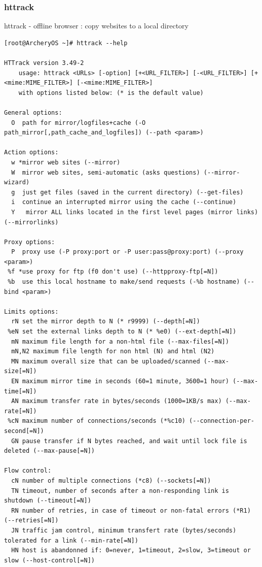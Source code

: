 \documentclass{article}
\begin{document}
\subsubsection{httrack}
httrack - offline browser : copy websites to a local directory
\begin{lstlisting}
[root@ArcheryOS ~]# httrack --help

HTTrack version 3.49-2
	usage: httrack <URLs> [-option] [+<URL_FILTER>] [-<URL_FILTER>] [+<mime:MIME_FILTER>] [-<mime:MIME_FILTER>]
	with options listed below: (* is the default value)

General options:
  O  path for mirror/logfiles+cache (-O path_mirror[,path_cache_and_logfiles]) (--path <param>)

Action options:
  w *mirror web sites (--mirror)
  W  mirror web sites, semi-automatic (asks questions) (--mirror-wizard)
  g  just get files (saved in the current directory) (--get-files)
  i  continue an interrupted mirror using the cache (--continue)
  Y   mirror ALL links located in the first level pages (mirror links) (--mirrorlinks)

Proxy options:
  P  proxy use (-P proxy:port or -P user:pass@proxy:port) (--proxy <param>)
 %f *use proxy for ftp (f0 don't use) (--httpproxy-ftp[=N])
 %b  use this local hostname to make/send requests (-%b hostname) (--bind <param>)

Limits options:
  rN set the mirror depth to N (* r9999) (--depth[=N])
 %eN set the external links depth to N (* %e0) (--ext-depth[=N])
  mN maximum file length for a non-html file (--max-files[=N])
  mN,N2 maximum file length for non html (N) and html (N2)
  MN maximum overall size that can be uploaded/scanned (--max-size[=N])
  EN maximum mirror time in seconds (60=1 minute, 3600=1 hour) (--max-time[=N])
  AN maximum transfer rate in bytes/seconds (1000=1KB/s max) (--max-rate[=N])
 %cN maximum number of connections/seconds (*%c10) (--connection-per-second[=N])
  GN pause transfer if N bytes reached, and wait until lock file is deleted (--max-pause[=N])

Flow control:
  cN number of multiple connections (*c8) (--sockets[=N])
  TN timeout, number of seconds after a non-responding link is shutdown (--timeout[=N])
  RN number of retries, in case of timeout or non-fatal errors (*R1) (--retries[=N])
  JN traffic jam control, minimum transfert rate (bytes/seconds) tolerated for a link (--min-rate[=N])
  HN host is abandonned if: 0=never, 1=timeout, 2=slow, 3=timeout or slow (--host-control[=N])


\end{lstlisting}
\end{document}
